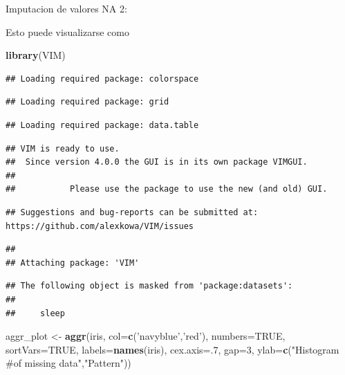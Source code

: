 \documentclass[ignorenonframetext,]{beamer}
\newenvironment{Shaded}{\begin{snugshade}}{\end{snugshade}}
\newcommand{\KeywordTok}[1]{\textcolor[rgb]{0.13,0.29,0.53}{\textbf{#1}}}
\newcommand{\DataTypeTok}[1]{\textcolor[rgb]{0.13,0.29,0.53}{#1}}
\newcommand{\DecValTok}[1]{\textcolor[rgb]{0.00,0.00,0.81}{#1}}
\newcommand{\StringTok}[1]{\textcolor[rgb]{0.31,0.60,0.02}{#1}}
\newcommand{\OtherTok}[1]{\textcolor[rgb]{0.56,0.35,0.01}{#1}}
\newcommand{\NormalTok}[1]{#1}
\begin{document}
\begin{frame}[fragile]{Imputacion de valores NA 2:}

Esto puede visualizarse como

\begin{Shaded}
\begin{Highlighting}[]
\KeywordTok{library}\NormalTok{(VIM)}
\end{Highlighting}
\end{Shaded}

\begin{verbatim}
## Loading required package: colorspace
\end{verbatim}

\begin{verbatim}
## Loading required package: grid
\end{verbatim}

\begin{verbatim}
## Loading required package: data.table
\end{verbatim}

\begin{verbatim}
## VIM is ready to use. 
##  Since version 4.0.0 the GUI is in its own package VIMGUI.
## 
##           Please use the package to use the new (and old) GUI.
\end{verbatim}

\begin{verbatim}
## Suggestions and bug-reports can be submitted at: https://github.com/alexkowa/VIM/issues
\end{verbatim}

\begin{verbatim}
## 
## Attaching package: 'VIM'
\end{verbatim}

\begin{verbatim}
## The following object is masked from 'package:datasets':
## 
##     sleep
\end{verbatim}

\begin{Shaded}
\begin{Highlighting}[]
\NormalTok{aggr_plot <-}\StringTok{ }\KeywordTok{aggr}\NormalTok{(iris, }\DataTypeTok{col=}\KeywordTok{c}\NormalTok{(}\StringTok{'navyblue'}\NormalTok{,}\StringTok{'red'}\NormalTok{), }\DataTypeTok{numbers=}\OtherTok{TRUE}\NormalTok{, }\DataTypeTok{sortVars=}\OtherTok{TRUE}\NormalTok{, }\DataTypeTok{labels=}\KeywordTok{names}\NormalTok{(iris), }\DataTypeTok{cex.axis=}\NormalTok{.}\DecValTok{7}\NormalTok{, }\DataTypeTok{gap=}\DecValTok{3}\NormalTok{, }\DataTypeTok{ylab=}\KeywordTok{c}\NormalTok{(}\StringTok{"Histogram #of missing data"}\NormalTok{,}\StringTok{"Pattern"}\NormalTok{))}
\end{Highlighting}
\end{Shaded}


\end{frame}
\end{document}

